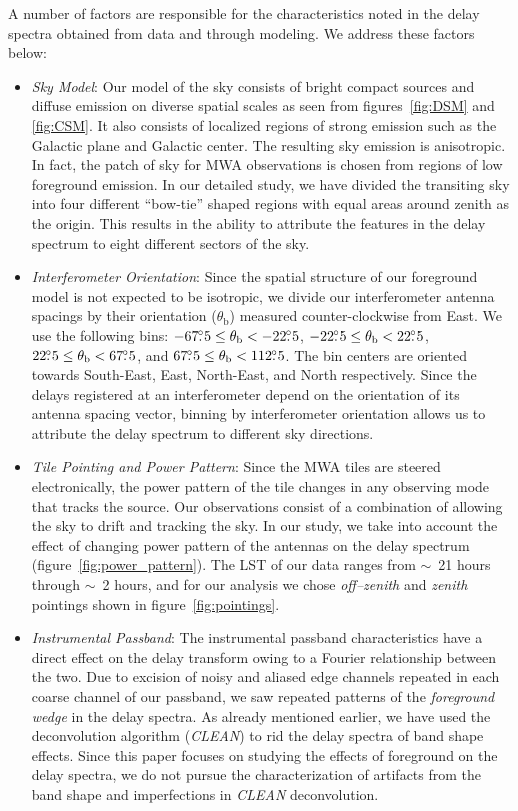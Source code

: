 \documentclass[preprint2,iop,numberedappendix]{emulateapj}
\begin{document}
A number of factors are responsible for the characteristics noted in the delay spectra obtained from data and through modeling. We address these factors below:
\begin{itemize}

\item {\it Sky Model}: Our model of the sky consists of bright compact sources and diffuse emission on diverse spatial scales as seen from figures~\ref{fig:DSM} and \ref{fig:CSM}. It also consists of localized regions of strong emission such as the Galactic plane and Galactic center. The resulting sky emission is anisotropic. In fact, the patch of sky for MWA observations is chosen from regions of low foreground emission. In our detailed study, we have divided the transiting sky into four different ``bow-tie'' shaped regions with equal areas around zenith as the origin. This results in the ability to attribute the features in the delay spectrum to eight different sectors of the sky. 

\item {\it Interferometer Orientation}: Since the spatial structure of our foreground model is not expected to be isotropic, we divide our interferometer antenna spacings by their orientation ($\theta_\textrm{b}$) measured counter-clockwise from East. We use the following bins: $-67\mbox{$.\!\!^\circ$} 5\le \theta_\textrm{b} < -22\mbox{$.\!\!^\circ$} 5$, $-22\mbox{$.\!\!^\circ$} 5\le \theta_\textrm{b} < 22\mbox{$.\!\!^\circ$} 5$, $22\mbox{$.\!\!^\circ$} 5\le \theta_\textrm{b} < 67\mbox{$.\!\!^\circ$} 5$, and $67\mbox{$.\!\!^\circ$} 5\le \theta_\textrm{b} < 112\mbox{$.\!\!^\circ$} 5$. The bin centers are oriented towards South-East, East, North-East, and North respectively. Since the delays registered at an interferometer depend on the orientation of its antenna spacing vector, binning by interferometer orientation allows us to attribute the delay spectrum to different sky directions.

\item {\it Tile Pointing and Power Pattern}: Since the MWA tiles are steered electronically, the power pattern of the tile changes in any observing mode that tracks the source. Our observations consist of a combination of allowing the sky to drift and tracking the sky. In our study, we take into account the effect of changing power pattern of the antennas on the delay spectrum (figure~\ref{fig:power_pattern}). The LST of our data ranges from $\sim$~21 hours through $\sim$~2 hours, and for our analysis we chose {\it off--zenith} and {\it zenith} pointings shown in figure~\ref{fig:pointings}. 

\item {\it Instrumental Passband}: The instrumental passband characteristics have a direct effect on the delay transform owing to a Fourier relationship between the two. Due to excision of noisy and aliased edge channels repeated in each coarse channel of our passband, we saw repeated patterns of the {\it foreground wedge} in the delay spectra. As already mentioned earlier, we have used the deconvolution algorithm ({\it CLEAN}) to rid the delay spectra of band shape effects. Since this paper focuses on studying the effects of foreground on the delay spectra, we do not pursue the characterization of artifacts from the band shape and imperfections in {\it CLEAN} deconvolution.


\end{itemize}
\end{document}
